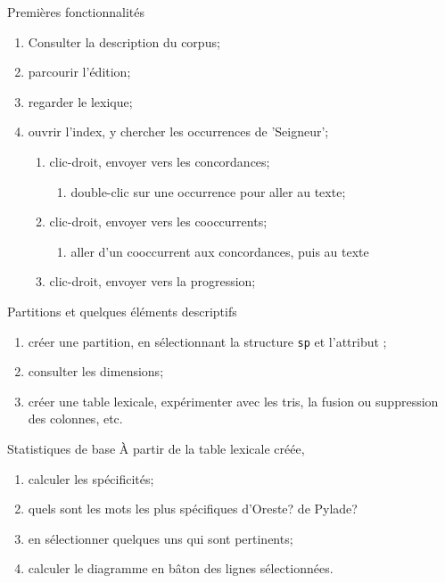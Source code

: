 \documentclass{beamer}
\begin{document}
\begin{frame}{Premières fonctionnalités}
\begin{enumerate}
\item Consulter la description du corpus;
\item parcourir l'édition;
\item regarder le lexique;
\item ouvrir l'index, y chercher les occurrences de 'Seigneur';
	\begin{enumerate}
		\item clic-droit, envoyer vers les concordances;
			\begin{enumerate}
				\item double-clic sur une occurrence pour aller au texte;
			\end{enumerate}
		\item clic-droit, envoyer vers les cooccurrents;
			\begin{enumerate}
				\item aller d'un cooccurrent aux concordances, puis au texte
			\end{enumerate}
		\item clic-droit, envoyer vers la progression;
	\end{enumerate}
\end{enumerate}

\end{frame}

\begin{frame}{Partitions et quelques éléments descriptifs}
\begin{enumerate}
\item créer une partition, en sélectionnant la structure \texttt{sp} et l'attribut \texttt{\@who};
\item consulter les dimensions;
\item créer une table lexicale, expérimenter avec les tris, la fusion ou suppression des colonnes, etc.
\end{enumerate}
\end{frame}

\begin{frame}{Statistiques de base}
À partir de la table lexicale créée,
\begin{enumerate}
\item calculer les spécificités;
\item quels sont les mots les plus spécifiques d'Oreste? de Pylade?
\item en sélectionner quelques uns qui sont pertinents;
\item calculer le diagramme en bâton des lignes sélectionnées.
\end{enumerate}
\end{frame}
\end{document}
